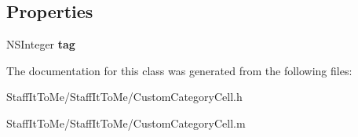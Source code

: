 \subsection*{\-Properties}
\begin{DoxyCompactItemize}
\item 
\hypertarget{interface_custom_category_cell_a4ce5db0529b15fd36e69f5aac72fe5cf}{
\-N\-S\-Integer {\bfseries tag}}
\label{interface_custom_category_cell_a4ce5db0529b15fd36e69f5aac72fe5cf}

\end{DoxyCompactItemize}


\-The documentation for this class was generated from the following files\-:\begin{DoxyCompactItemize}
\item 
\-Staff\-It\-To\-Me/\-Staff\-It\-To\-Me/\-Custom\-Category\-Cell.\-h\item 
\-Staff\-It\-To\-Me/\-Staff\-It\-To\-Me/\-Custom\-Category\-Cell.\-m\end{DoxyCompactItemize}
